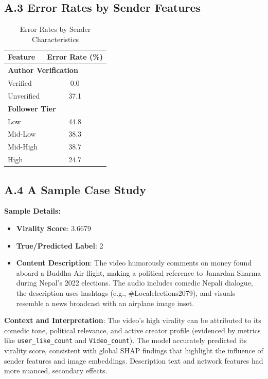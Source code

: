 \documentclass[12pt,a4paper]{report}
\begin{document}
\subsection*{A.3 Error Rates by Sender Features}

\begin{table}[H]
\centering
\caption{Error Rates by Sender Characteristics}
\label{tab:error_by_sender}
\begin{tabular}{lc}
\toprule
\textbf{Feature} & \textbf{Error Rate (\%)} \\
\midrule
\multicolumn{2}{l}{\textbf{Author Verification}} \\
Verified & 0.0 \\
Unverified & 37.1 \\
\midrule
\multicolumn{2}{l}{\textbf{Follower Tier}} \\
Low & 44.8 \\
Mid-Low & 38.3 \\
Mid-High & 38.7 \\
High & 24.7 \\
\bottomrule
\end{tabular}
\end{table}

\subsection*{A.4 A Sample Case Study}
\label{app:samplecase}
\textbf{Sample Details:}
\begin{itemize}
    \item \textbf{Virality Score}: 3.6679
    \item \textbf{True/Predicted Label}: 2
    \item \textbf{Content Description}: The video humorously comments on money found aboard a Buddha Air flight, making a political reference to Janardan Sharma during Nepal’s 2022 elections. The audio includes comedic Nepali dialogue, the description uses hashtags (e.g., \#Localelections2079), and visuals resemble a news broadcast with an airplane image inset.
\end{itemize}

\textbf{Context and Interpretation}: The video's high virality can be attributed to its comedic tone, political relevance, and active creator profile (evidenced by metrics like \texttt{user\_like\_count} and \texttt{Video\_count}). The model accurately predicted its virality score, consistent with global SHAP findings that highlight the influence of sender features and image embeddings. Description text and network features had more nuanced, secondary effects.
\clearpage
\end{document}
